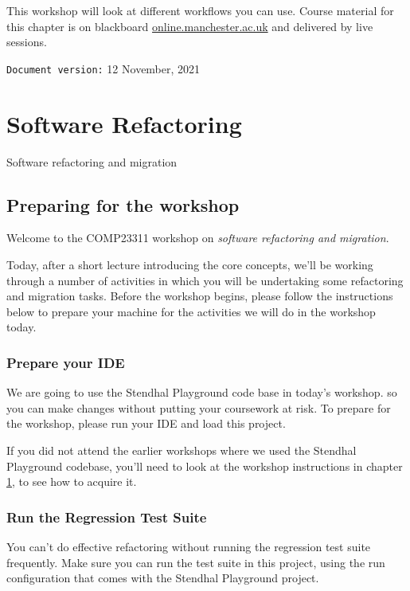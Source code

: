 \documentclass[
]{book}
\begin{document}
This workshop will look at different workflows you can use. Course material for this chapter is on blackboard \href{https://online.manchester.ac.uk}{online.manchester.ac.uk} and delivered by live sessions.

\texttt{Document\ version:} 12 November, 2021

\hypertarget{refactoring}{%
\chapter{Software Refactoring}\label{refactoring}}

Software refactoring and migration

\hypertarget{gitprep}{%
\section{Preparing for the workshop}\label{gitprep}}

Welcome to the COMP23311 workshop on \emph{software refactoring and migration}.

Today, after a short lecture introducing the core concepts, we'll be working through a number of activities in which you will be undertaking some refactoring and migration tasks. Before the workshop begins, please follow the instructions below to prepare your machine for the activities we will do in the workshop today.

\hypertarget{prepide}{%
\subsection{Prepare your IDE}\label{prepide}}

We are going to use the Stendhal Playground code base in today's workshop. so you can make changes without putting your coursework at risk. To prepare for the workshop, please run your IDE and load this project.

If you did not attend the earlier workshops where we used the Stendhal Playground codebase, you'll need to look at the workshop instructions in chapter \ref{refactoring}, to see how to acquire it.

\hypertarget{testsuite}{%
\subsection{Run the Regression Test Suite}\label{testsuite}}

You can't do effective refactoring without running the regression test suite frequently. Make sure you can run the test suite in this project, using the run configuration that comes with the Stendhal Playground project.
\end{document}
